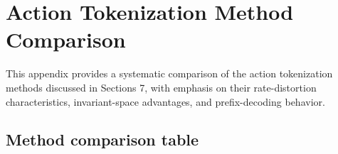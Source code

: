 \documentclass[11pt]{article}
\begin{document}
\section{Action Tokenization Method Comparison}
\label{app:tokenization_comparison}

This appendix provides a systematic comparison of the action tokenization methods discussed in Sections 7, with emphasis on their rate-distortion characteristics, invariant-space advantages, and prefix-decoding behavior.

\subsection{Method comparison table}

\begin{table}[htbp]
\centering
\caption{\textbf{Comparison of action tokenization methods.} Each row summarizes a tokenization approach in terms of its core mechanism, compression behavior, ordering properties, training requirements, and key references.}
\label{tab:tokenization_comparison}
\end{table}
\end{document}
